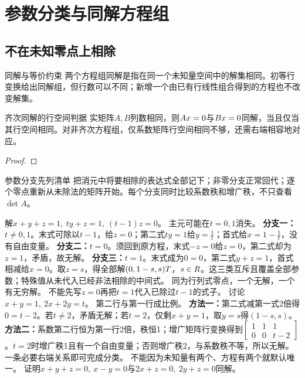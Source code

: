 \section{参数分类与同解方程组}
\subsection{不在未知零点上相除}
\begin{definition}{同解与等价约束}
两个方程组同解是指在同一个未知量空间中的解集相同。初等行变换给出同解组，但行数可以不同；新增一个由已有行线性组合得到的方程也不改变解集。
\end{definition}
\begin{theorem}{齐次同解的行空间判据}
实矩阵$A,B$列数相同，则$Ax=0$与$Bx=0$同解，当且仅当其行空间相同。对非齐次方程组，仅系数矩阵行空间相同不够，还需右端相容地对应。
\end{theorem}
\begin{proof}

\end{proof}
\begin{method}{参数分支先列清单}
把消元中将要相除的表达式全部记下；非零分支正常回代；逐个零点重新从未除法的矩阵开始。每个分支同时比较系数秩和增广秩，不只查看$\det A$。
\end{method}
{解$x+y+z=1,\ ty+z=1,\ (t-1)z=0$。}
{主元可能在$t=0,1$消失。}
{\textbf{分支一：}$t\ne0,1$。末式可除以$t-1$，给$z=0$；第二式$ty=1$给$y=\frac{1}{t}$；首式给$x=1-\frac{1}{t}$，没有自由变量。
\textbf{分支二：}$t=0$。须回到原方程，末式$-z=0$给$z=0$，第二式却为$z=1$，矛盾，故无解。
\textbf{分支三：}$t=1$。末式成为$0=0$，第二式$y+z=1$，首式相减给$x=0$。取$z=s$，得全部解$(0,1-s,s)T$，$s\in R$。这三类互斥且覆盖全部参数；特殊值从未代入已经非法相除的中间式。}
{同为行列式零点，一个无解，一个有无穷解。}
{不能先写$z=0$再把$t=1$代入已除过$t-1$的式子。}
{讨论$x+y=1,\ 2x+2y=t$。}
{第二行与第一行成比例。}
{\textbf{方法一：}第二式减第一式2倍得$0=t-2$。若$t\ne2$，矛盾无解；若$t=2$，仅剩$x+y=1$，取$y=s$得$(1-s,s)$。
\textbf{方法二：}系数第二行恒为第一行2倍，秩恒1；增广矩阵行变换得到$\left[\begin{array}{cc|c}1&1&1\\0&0&t-2\end{array}\right]$。$t=2$时增广秩1且有一个自由变量；否则增广秩2，与系数秩不等，所以无解。}
{一条必要右端关系即可完成分类。}
{不能因为未知量有两个、方程有两个就默认唯一。}
{证明$x+y+z=0,\ x-y=0$与$2x+z=0,\ 2y+z=0$同解。}
